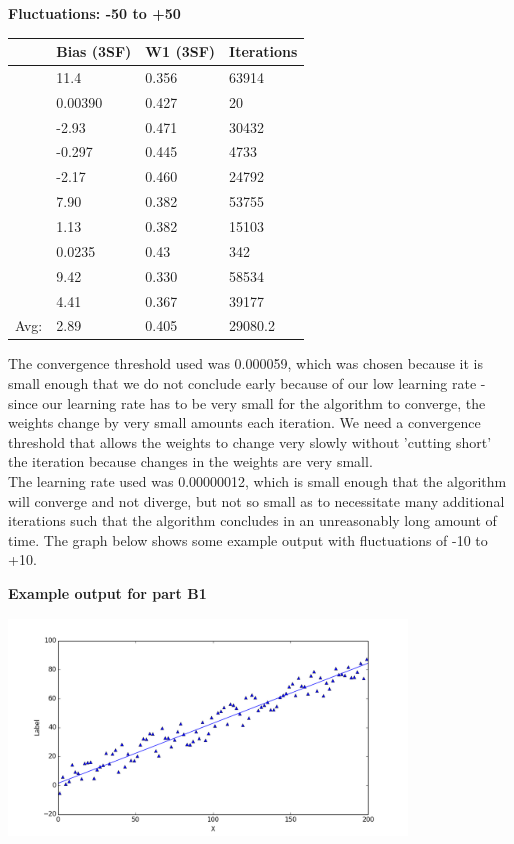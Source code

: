\documentclass{article}
\begin{document}
\vspace{5mm}
\begin{center}
    \textbf{Fluctuations: -50 to +50}        \\
    \begin{tabular}{ r | l | l | l }
        \hline
        & Bias (3SF) & W1 (3SF) & Iterations \\
        \hline
        & 11.4       & 0.356    & 63914      \\
        & 0.00390    & 0.427    & 20         \\
        & -2.93      & 0.471    & 30432      \\
        & -0.297     & 0.445    & 4733       \\
        & -2.17      & 0.460    & 24792      \\
        & 7.90       & 0.382    & 53755      \\
        & 1.13       & 0.382    & 15103      \\
        & 0.0235     & 0.43     & 342        \\
        & 9.42       & 0.330    & 58534      \\
        & 4.41       & 0.367    & 39177      \\
        \hline
   Avg: & 2.89       & 0.405    & 29080.2    \\
        \hline
    \end{tabular}
\end{center}

\noindent The convergence threshold used was 0.000059, which was chosen because it is small enough that we do not conclude early because of our low learning rate - since our learning rate has to be very small for the algorithm to converge, the weights change by very small amounts each iteration. We need a convergence threshold that allows the weights to change very slowly without 'cutting short' the iteration because changes in the weights are very small. \\
\indent The learning rate used was 0.00000012, which is small enough that the algorithm will converge and not diverge, but not so small as to necessitate many additional iterations such that the algorithm concludes in an unreasonably long amount of time.
\indent The graph below shows some example output with fluctuations of -10 to +10.
\begin{center}
\textbf{Example output for part B1}\\
\centerline{\includegraphics[width=400px, height=220px]{partB1}}
\vspace{2mm}
\end{center}
\end{document}
